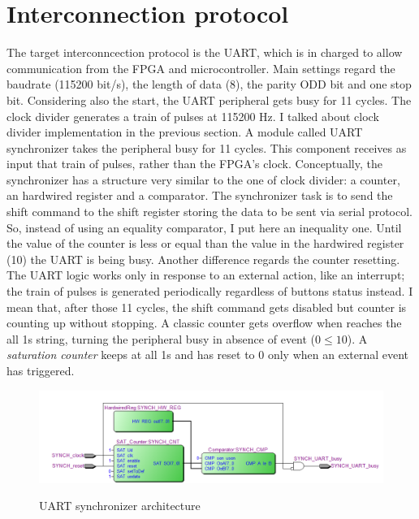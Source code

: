 \section{Interconnection protocol}
The target interconncection protocol is the UART, which is in charged to allow communication from the FPGA and microcontroller. Main settings regard the baudrate (115200 bit/s), the length of data (8), the parity ODD bit and one stop bit. Considering also the start, the UART peripheral gets busy for 11 cycles.
\newline
\newline
The clock divider generates a train of pulses at 115200 Hz. I talked about clock divider implementation in the previous section. A module called UART synchronizer takes the peripheral busy for 11 cycles. This component receives as input that train of pulses, rather than the FPGA's clock. Conceptually, the synchronizer has a structure very similar to the one of clock divider: a counter, an hardwired register and a comparator. The synchronizer task is to send the shift command to the shift register storing the data to be sent via serial protocol. So, instead of using an equality comparator, I put here an inequality one. Until the value of the counter is less or equal than the value in the hardwired register (10) the UART is being busy. Another difference regards the counter resetting. The UART logic works only in response to an external action, like an interrupt; the train of pulses is generated periodically regardless of buttons status instead. I mean that, after those 11 cycles, the shift command gets disabled but counter is counting up without stopping. A classic counter gets overflow when reaches the all 1s string, turning the peripheral busy in absence of event ($0 \leq 10$). A \textit{saturation counter} keeps at all 1s and has reset to 0 only when an external event has triggered.

\begin{figure}[H]
\centering
\includegraphics[scale=.8]{Immagini/20}
\label{20}
\caption{UART synchronizer architecture}
\end{figure}

